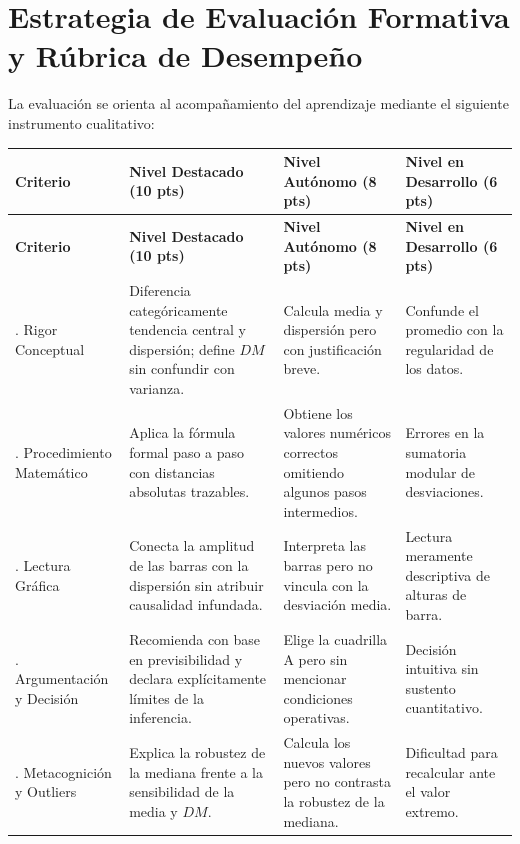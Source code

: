 \documentclass[spanish,letterpaper,oneside]{article}
\begin{document}
\section{Estrategia de Evaluación Formativa y Rúbrica de Desempeño}
La evaluación se orienta al acompañamiento del aprendizaje mediante el siguiente instrumento cualitativo:

\begin{center}
{\small{}\renewcommand{\arraystretch}{1.25}
\begin{longtable}{|>{\raggedright\arraybackslash}p{2.5cm}|>{\raggedright\arraybackslash}p{4cm}|>{\raggedright\arraybackslash}p{4cm}|>{\raggedright\arraybackslash}p{3.5cm}|}\hline
\rowcolor{iiiepePale} \textbf{Criterio} & \textbf{Nivel Destacado (10 pts)} & \textbf{Nivel Autónomo (8 pts)} & \textbf{Nivel en Desarrollo (6 pts)} \\\hline
\endfirsthead
\hline
\rowcolor{iiiepePale} \textbf{Criterio} & \textbf{Nivel Destacado (10 pts)} & \textbf{Nivel Autónomo (8 pts)} & \textbf{Nivel en Desarrollo (6 pts)} \\\hline
\endhead
1. Rigor Conceptual & Diferencia categóricamente tendencia central y dispersión; define $DM$ sin confundir con varianza. & Calcula media y dispersión pero con justificación breve. & Confunde el promedio con la regularidad de los datos. \\\hline
2. Procedimiento Matemático & Aplica la fórmula formal paso a paso con distancias absolutas trazables. & Obtiene los valores numéricos correctos omitiendo algunos pasos intermedios. & Errores en la sumatoria modular de desviaciones. \\\hline
3. Lectura Gráfica & Conecta la amplitud de las barras con la dispersión sin atribuir causalidad infundada. & Interpreta las barras pero no vincula con la desviación media. & Lectura meramente descriptiva de alturas de barra. \\\hline
4. Argumentación y Decisión & Recomienda con base en previsibilidad y declara explícitamente límites de la inferencia. & Elige la cuadrilla A pero sin mencionar condiciones operativas. & Decisión intuitiva sin sustento cuantitativo. \\\hline
5. Metacognición y Outliers & Explica la robustez de la mediana frente a la sensibilidad de la media y $DM$. & Calcula los nuevos valores pero no contrasta la robustez de la mediana. & Dificultad para recalcular ante el valor extremo. \\\hline
\end{longtable}}
\end{center}
\end{document}
